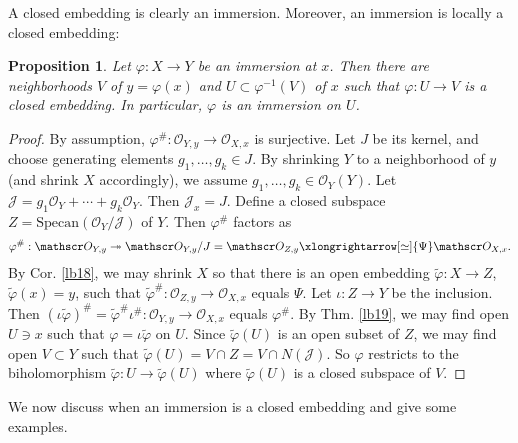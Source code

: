 \documentclass[12pt,b5paper,notitlepage]{report}
\theoremstyle{definition}
\theoremstyle{plain}
\newtheorem{pp}[df]{Proposition}
\newcommand{\mc}{\mathcal}
\newcommand{\wtd}{\widetilde}
\newcommand{\scr}{\mathscr}
\newcommand{\Specan}{\mathrm{Specan}}
\numberwithin{equation}{section}
\begin{document}
A closed embedding is clearly an immersion. Moreover, an immersion is locally a closed embedding:




\begin{pp}\label{lb21}
Let $\varphi:X\rightarrow Y$ be an immersion at $x$. Then there are neighborhoods $V$ of $y=\varphi(x)$ and $U\subset\varphi^{-1}(V)$ of $x$  such that $\varphi:U\rightarrow V$ is a closed embedding. In particular, $\varphi$ is an immersion on $U$.
\end{pp}




\begin{proof}
By assumption, $\varphi^\#:\scr O_{Y,y}\rightarrow\scr O_{X,x}$ is surjective. Let $J$ be its kernel, and choose generating elements $g_1,\dots,g_k\in J$. By shrinking $Y$ to a neighborhood of $y$ (and shrink $X$ accordingly), we assume $g_1,\dots,g_k\in\scr O_Y(Y)$. Let $\mc J=g_1\scr O_Y+\cdots+g_k\scr O_Y$. Then $\mc J_x=J$. Define a closed subspace $Z=\Specan(\scr O_Y/\mc J)$ of $Y$. Then $\varphi^\#$ factors as
\begin{align*}
\varphi^\#:\scr O_{Y,y}\twoheadrightarrow \scr O_{Y,y}/J=\scr O_{Z,y}\xlongrightarrow[\simeq]{\Psi}\scr O_{X,x}.
\end{align*}
By Cor. \ref{lb18}, we may shrink $X$ so that there is an open embedding $\wtd\varphi:X\rightarrow Z$, $\wtd\varphi(x)=y$, such that $\wtd\varphi^\#:\scr O_{Z,y}\rightarrow\scr O_{X,x}$ equals $\Psi$. Let $\iota:Z\rightarrow Y$ be the inclusion. Then $(\iota\wtd\varphi)^\#=\wtd\varphi^\#\iota^\#:\scr O_{Y,y}\rightarrow\scr O_{X,x}$ equals $\varphi^\#$. By Thm. \ref{lb19}, we may find open $U\ni x$  such that $\varphi=\iota\wtd\varphi$ on $U$. Since $\wtd\varphi(U)$ is an open subset of $Z$, we may find open $V\subset Y$ such that $\wtd\varphi(U)=V\cap Z=V\cap N(\mc J)$. So $\varphi$ restricts to the biholomorphism $\wtd\varphi:U\rightarrow\wtd\varphi(U)$ where $\wtd\varphi(U)$ is a closed subspace of $V$.
\end{proof}





We now discuss when an immersion is a closed embedding and give some examples.
\end{document}
